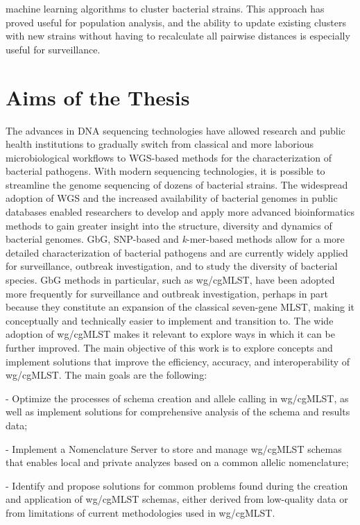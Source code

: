 machine learning algorithms to cluster bacterial strains. This approach has proved useful for population analysis, and the ability to update existing clusters with new strains without having to recalculate all pairwise distances is especially useful for surveillance.

\section{Aims of the Thesis}

The advances in \ac{DNA} sequencing technologies have allowed research and public health institutions to gradually switch from classical and more laborious microbiological workflows to \ac{WGS}-based methods for the characterization of bacterial pathogens. With modern sequencing technologies, it is possible to streamline the genome sequencing of dozens of bacterial strains. The widespread adoption of \ac{WGS} and the increased availability of bacterial genomes in public databases enabled researchers to develop and apply more advanced bioinformatics methods to gain greater insight into the structure, diversity and dynamics of bacterial genomes. \ac{GbG}, \ac{SNP}-based and \textit{k}-mer-based methods allow for a more detailed characterization of bacterial pathogens and are currently widely applied for surveillance, outbreak investigation, and to study the diversity of bacterial species. \ac{GbG} methods in particular, such as \ac{wg/cgMLST}, have been adopted more frequently for surveillance and outbreak investigation, perhaps in part because they constitute an expansion of the classical seven-gene \ac{MLST}, making it conceptually and technically easier to implement and transition to. The wide adoption of \ac{wg/cgMLST} makes it relevant to explore ways in which it can be further improved. The main objective of this work is to explore concepts and implement solutions that improve the efficiency, accuracy, and interoperability of \ac{wg/cgMLST}. The main goals are the following:

- Optimize the processes of schema creation and allele calling in \ac{wg/cgMLST}, as well as implement solutions for comprehensive analysis of the schema and results data;

- Implement a Nomenclature Server to store and manage \ac{wg/cgMLST} schemas that enables local and private analyzes based on a common allelic nomenclature;

- Identify and propose solutions for common problems found during the creation and application of \ac{wg/cgMLST} schemas, either derived from low-quality data or from limitations of current methodologies used in \ac{wg/cgMLST}.

